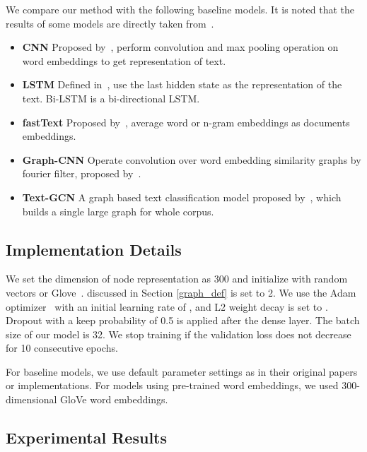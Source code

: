 \documentclass[11pt,a4paper]{article}
\begin{document}
We compare our method with the following baseline models. 
It is noted that the results of some models are directly taken from~\cite{yao2018graph}.

\begin{itemize}
     \item \textbf{CNN} Proposed by~\cite{kim2014convolutional}, perform convolution and max pooling operation on word embeddings to get representation of text. 
     
     \item \textbf{LSTM} Defined in~\cite{liu2016recurrent}, use the last hidden state as the representation of the text. Bi-LSTM is a bi-directional LSTM.
     
     \item \textbf{fastText} Proposed by~\cite{joulin2016bag}, average word or n-gram embeddings as documents embeddings.
     
    \item \textbf{Graph-CNN} Operate convolution over word embedding similarity graphs by fourier filter, proposed by~\cite{defferrard2016convolutional}.
    
    \item \textbf{Text-GCN} A graph based text classification model proposed by~\cite{yao2018graph}, which builds a single large graph for whole corpus.
\end{itemize}

\subsection{Implementation Details}
We set the dimension of node representation as 300 and initialize with random vectors or Glove~\cite{pennington2014glove}.  discussed in Section \ref{graph_def} is set to 2. We use the Adam optimizer~\cite{kingma2014adam} with an initial learning rate of , and L2 weight decay is set to .  Dropout with a keep probability of 0.5 is applied after the dense layer. The batch size of our model is 32. We stop training if the validation loss does not decrease for 10 consecutive epochs. 

For baseline models, we use default parameter settings as in their original papers or implementations. For models using pre-trained word embeddings, we used 300-dimensional GloVe word embeddings.






\subsection{Experimental Results}
\end{document}
